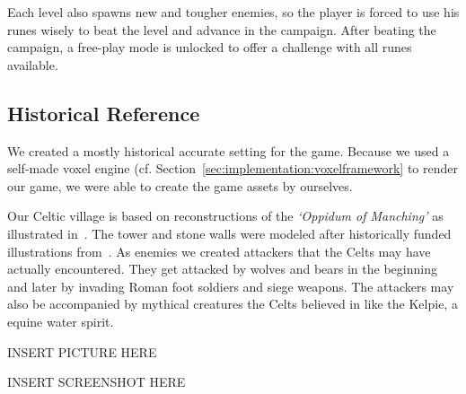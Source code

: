 Each level also spawns new and tougher enemies, so the player is forced to use his runes wisely to beat the level and advance in the campaign.
After beating the campaign, a free-play mode is unlocked to offer a challenge with all runes available.


\subsection{Historical Reference}
\label{sec:game_design:subsec:history}

We created a mostly historical accurate setting for the game. Because we used a self-made voxel engine (cf. Section~\ref{sec:implementation:voxelframework} to render our game, we were able to create the game assets by ourselves.

Our Celtic village is based on reconstructions of the \textit{`Oppidum of Manching'} as illustrated in~\cite{kraemer-oppidum-maching}. The tower and stone walls were modeled after historically funded illustrations from~\cite{kraemer-oppidum-maching}\cite{rieckhoff-walls1}\cite{rieckhoff-walls2}\cite{rieckhoff-tower}. As enemies we created attackers that the Celts may have actually encountered.
They get attacked by wolves and bears in the beginning and later by invading Roman foot soldiers and siege weapons.
The attackers may also be accompanied by mythical creatures the Celts believed in like the Kelpie, a equine water spirit.



INSERT PICTURE HERE

INSERT SCREENSHOT HERE






